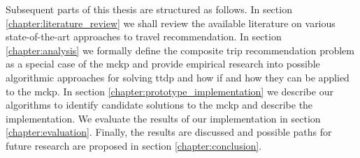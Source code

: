 Subsequent parts of this thesis are structured as follows. In section \ref{chapter:literature_review} we shall review the available literature on various state-of-the-art approaches to travel recommendation. In section \ref{chapter:analysis} we formally define the composite trip recommendation problem as a special case of the \gls{mckp} and provide empirical research into possible algorithmic approaches for solving \gls{ttdp} and how if and how they can be applied to the \gls{mckp}. In section \ref{chapter:prototype_implementation} we describe our algorithms to identify candidate solutions to the \gls{mckp} and describe the implementation. We evaluate the results of our implementation in section \ref{chapter:evaluation}. Finally, the results are discussed and possible paths for future research are proposed in section \ref{chapter:conclusion}. 


